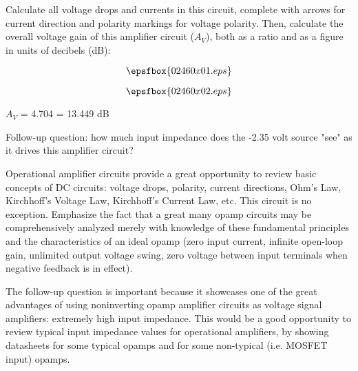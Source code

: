 

Calculate all voltage drops and currents in this circuit, complete with arrows for current direction and polarity markings for voltage polarity.  Then, calculate the overall voltage gain of this amplifier circuit ($A_V$), both as a ratio and as a figure in units of decibels (dB):

$$\epsfbox{02460x01.eps}$$







$$\epsfbox{02460x02.eps}$$

$A_V$ = 4.704 = 13.449 dB

\vskip 10pt

Follow-up question: how much input impedance does the -2.35 volt source "see" as it drives this amplifier circuit?







Operational amplifier circuits provide a great opportunity to review basic concepts of DC circuits: voltage drops, polarity, current directions, Ohm's Law, Kirchhoff's Voltage Law, Kirchhoff's Current Law, etc.  This circuit is no exception.  Emphasize the fact that a great many opamp circuits may be comprehensively analyzed merely with knowledge of these fundamental principles and the characteristics of an ideal opamp (zero input current, infinite open-loop gain, unlimited output voltage swing, zero voltage between input terminals when negative feedback is in effect).

The follow-up question is important because it showcases one of the great advantages of using noninverting opamp amplifier circuits as voltage signal amplifiers: extremely high input impedance.  This would be a good opportunity to review typical input impedance values for operational amplifiers, by showing datasheets for some typical opamps and for some non-typical (i.e. MOSFET input) opamps.





